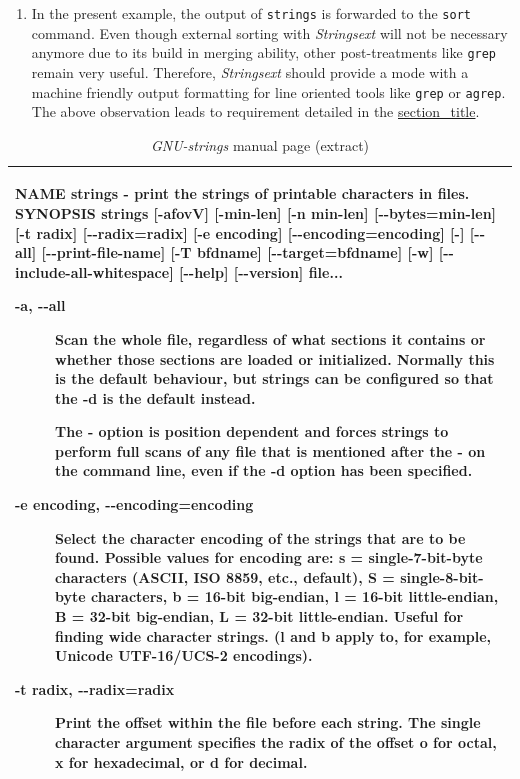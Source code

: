 \begin{enumerate}
  leads to requirement detailed in the
  \protect\hyperlink{req-batch-processing}{section\_title}.
\item
  In the present example, the output of \texttt{strings} is forwarded to
  the \texttt{sort} command. Even though external sorting with
  \emph{Strings­ext} will not be necessary anymore due to its build in
  merging ability, other post-treatments like \texttt{grep} remain very
  useful. Therefore, \emph{Strings­ext} should provide a mode with a
  machine friendly output formatting for line oriented tools like
  \texttt{grep} or \texttt{agrep}. The above observation leads to
  requirement detailed in the
  \protect\hyperlink{req-post-treatment}{section\_title}.
\end{enumerate}

\begin{longtable}[]{@{}l@{}}
\caption{\emph{GNU-strings} manual page (extract)}\tabularnewline
\toprule
\begin{minipage}[t]{0.97\columnwidth}\raggedright\strut
NAME strings - print the strings of printable characters in files.
SYNOPSIS strings {[}-afovV{]} {[}-min-len{]} {[}-n min-len{]}
{[}-\/-bytes=min-len{]} {[}-t radix{]} {[}-\/-radix=radix{]} {[}-e
encoding{]} {[}-\/-encoding=encoding{]} {[}-{]} {[}-\/-all{]}
{[}-\/-print-file-name{]} {[}-T bfdname{]} {[}-\/-target=bfdname{]}
{[}-w{]} {[}-\/-include-all-whitespace{]} {[}-\/-help{]}
{[}-\/-version{]} file...

\begin{description}
\item[-a, -\/-all]
Scan the whole file, regardless of what sections it contains or whether
those sections are loaded or initialized. Normally this is the default
behaviour, but strings can be configured so that the -d is the default
instead.

The - option is position dependent and forces strings to perform full
scans of any file that is mentioned after the - on the command line,
even if the -d option has been specified.
\item[-e encoding, -\/-encoding=encoding]
Select the character encoding of the strings that are to be found.
Possible values for encoding are: s = single-7-bit-byte characters
(ASCII, ISO 8859, etc., default), S = single-8-bit-byte characters, b =
16-bit big-endian, l = 16-bit little-endian, B = 32-bit big-endian, L =
32-bit little-endian. Useful for finding wide character strings. (l and
b apply to, for example, Unicode UTF-16/UCS-2 encodings).
\item[-t radix, -\/-radix=radix]
Print the offset within the file before each string. The single
character argument specifies the radix of the offset o for octal, x for
hexadecimal, or d for decimal.
\end{description}\strut
\end{minipage}\tabularnewline
\bottomrule
\end{longtable}

